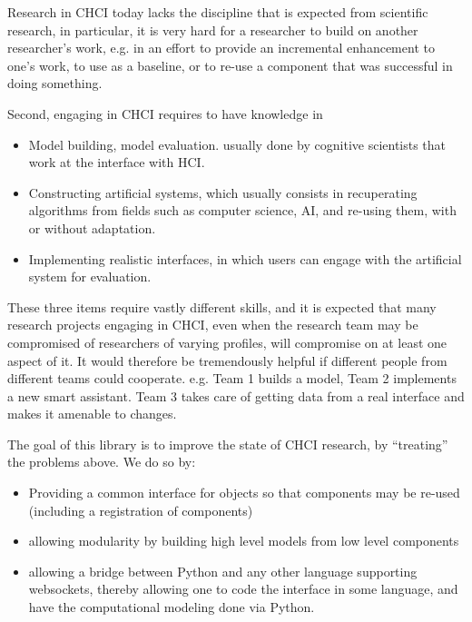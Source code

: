 \documentclass[12pt,a4paper]{article}
\begin{document}
Research in CHCI today lacks the discipline that is expected from scientific research, in particular, it is very hard for a researcher to build on another researcher's work, e.g. in an effort to provide an incremental enhancement to one's work, to use as a baseline, or to re-use a component that was successful in doing something.


Second, engaging in CHCI requires to have knowledge in
	\begin{itemize}
		\item Model building, model evaluation. usually done by cognitive scientists that work at the interface with HCI.
		\item Constructing artificial systems, which usually consists in recuperating algorithms from fields such as computer science, AI, and re-using them, with or without adaptation.
		\item Implementing realistic interfaces, in which users can engage with the artificial system for evaluation.
	\end{itemize}

These three items require vastly different skills, and it is expected that many research projects engaging in CHCI, even when the research team may be compromised of researchers of varying profiles, will compromise on at least one aspect of it.
It would therefore be tremendously helpful if different people from different teams could cooperate. e.g. Team 1 builds a model, Team 2 implements a new smart assistant. Team 3 takes care of getting data from a real interface and makes it amenable to changes.

The goal of this library is to improve the state of CHCI research, by ``treating'' the problems above.
We do so by:
	\begin{itemize}
	\item Providing a common interface for objects so that components may be re-used (including a registration of components)
	\item allowing modularity by building high level models from low level components
	\item allowing a bridge between Python and any other language supporting websockets, thereby allowing one to code the interface in some language, and have the computational modeling done via Python.
	\end{itemize}



\newpage
\end{document}
